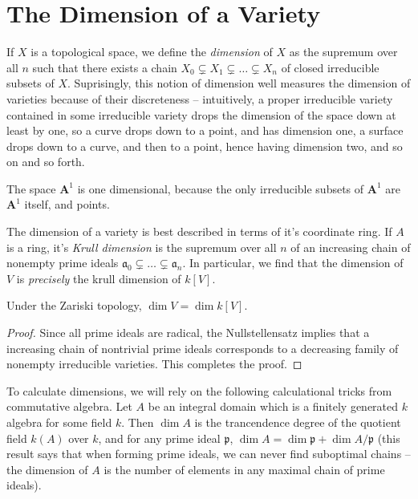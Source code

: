 \section{The Dimension of a Variety}

If $X$ is a topological space, we define the \emph{dimension} of $X$ as the supremum over all $n$ such that there exists a chain $X_0 \subsetneq X_1 \subsetneq \dots \subsetneq X_n$ of closed irreducible subsets of $X$. Suprisingly, this notion of dimension well measures the dimension of varieties because of their discreteness -- intuitively, a proper irreducible variety contained in some irreducible variety drops the dimension of the space down at least by one, so a curve drops down to a point, and has dimension one, a surface drops down to a curve, and then to a point, hence having dimension two, and so on and so forth.

\begin{example}
    The space $\mathbf{A}^1$ is one dimensional, because the only irreducible subsets of $\mathbf{A}^1$ are $\mathbf{A}^1$ itself, and points.
\end{example}

The dimension of a variety is best described in terms of it's coordinate ring. If $A$ is a ring, it's \emph{Krull dimension} is the supremum over all $n$ of an increasing chain of nonempty prime ideals $\mathfrak{a}_0 \subsetneq \dots \subsetneq \mathfrak{a}_n$. In particular, we find that the dimension of $V$ is {\it precisely} the krull dimension of $k[V]$.

\begin{theorem}
    Under the Zariski topology, $\dim V = \dim k[V]$.
\end{theorem}
\begin{proof}
    Since all prime ideals are radical, the Nullstellensatz implies that a increasing chain of nontrivial prime ideals corresponds to a decreasing family of nonempty irreducible varieties. This completes the proof.
\end{proof}

To calculate dimensions, we will rely on the following calculational tricks from commutative algebra. Let $A$ be an integral domain which is a finitely generated $k$ algebra for some field $k$. Then $\dim A$ is the trancendence degree of the quotient field $k(A)$ over $k$, and for any prime ideal $\mathfrak{p}$, $\dim A = \dim \mathfrak{p} + \dim A/\mathfrak{p}$ (this result says that when forming prime ideals, we can never find suboptimal chains -- the dimension of $A$ is the number of elements in any maximal chain of prime ideals).

